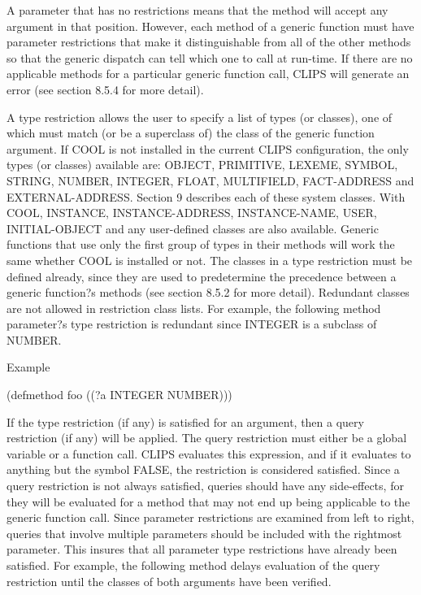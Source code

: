 \documentclass[letterpaper,10pt,english]{sphinxmanual}
\begin{document}
A parameter that has no restrictions means that the method will accept
any argument in that position. However, each method of a generic
function must have parameter restrictions that make it distinguishable
from all of the other methods so that the generic dispatch can tell
which one to call at run-time. If there are no applicable methods for a
particular generic function call, CLIPS will generate an error (see
section 8.5.4 for more detail).

A type restriction allows the user to specify a list of types (or
classes), one of which must match (or be a superclass of) the class of
the generic function argument. If COOL is not installed in the current
CLIPS configuration, the only types (or classes) available are: OBJECT,
PRIMITIVE, LEXEME, SYMBOL, STRING, NUMBER, INTEGER, FLOAT, MULTIFIELD,
FACT-ADDRESS and EXTERNAL-ADDRESS. Section 9 describes each of these
system classes. With COOL, INSTANCE, INSTANCE-ADDRESS, INSTANCE-NAME,
USER, INITIAL-OBJECT and any user-defined classes are also available.
Generic functions that use only the first group of types in their
methods will work the same whether COOL is installed or not. The classes
in a type restriction must be defined already, since they are used to
predetermine the precedence between a generic function?s methods (see
section 8.5.2 for more detail). Redundant classes are not allowed in
restriction class lists. For example, the following method parameter?s
type restriction is redundant since INTEGER is a subclass of NUMBER.

Example

\begin{sphinxVerbatim}[commandchars=\\\{\}]
(defmethod foo ((?a INTEGER NUMBER)))
\end{sphinxVerbatim}

If the type restriction (if any) is satisfied for an argument, then a
query restriction (if any) will be applied. The query restriction must
either be a global variable or a function call. CLIPS evaluates this
expression, and if it evaluates to anything but the symbol FALSE, the
restriction is considered satisfied. Since a query restriction is not
always satisfied, queries should  have any side-effects, for they
will be evaluated for a method that may not end up being applicable to
the generic function call. Since parameter restrictions are examined
from left to right, queries that involve multiple parameters should be
included with the rightmost parameter. This insures that all parameter
type restrictions have already been satisfied. For example, the
following method delays evaluation of the query restriction until the
classes of both arguments have been verified.
\end{document}
